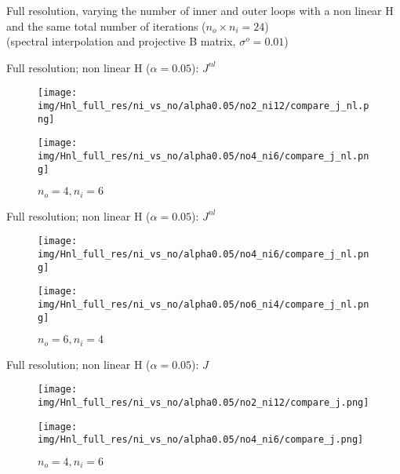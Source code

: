\documentclass[francais]{beamer}
\begin{document}
\begin{frame}
\begin{center}
\large{Full resolution, varying the number of inner and outer loops with a non linear H and the same total number of iterations ($n_o \times n_i =24$)\\
(spectral interpolation and projective B matrix,
$\sigma^o=0.01$)}
\end{center}
\end{frame}


\begin{frame}{Full resolution; non linear H ($\alpha = 0.05$): $J^{nl}$}
\begin{center}
\begin{figure}
  \texttt{[image: img/Hnl\_full\_res/ni\_vs\_no/alpha0.05/no2\_ni12/compare\_j\_nl.png]}
  \caption{$n_o = 2, n_i = 12$}
\endminipage\hfill
{}
  \texttt{[image: img/Hnl\_full\_res/ni\_vs\_no/alpha0.05/no4\_ni6/compare\_j\_nl.png]}
  \caption{$n_o = 4, n_i = 6$}
\endminipage
\end{figure}
\end{center}
\end{frame}

\begin{frame}{Full resolution; non linear H ($\alpha = 0.05$): $J^{nl}$}
\begin{center}
\begin{figure}
  \texttt{[image: img/Hnl\_full\_res/ni\_vs\_no/alpha0.05/no4\_ni6/compare\_j\_nl.png]}
  \caption{$n_o = 4, n_i = 6$}
\endminipage\hfill
{}
  \texttt{[image: img/Hnl\_full\_res/ni\_vs\_no/alpha0.05/no6\_ni4/compare\_j\_nl.png]}
  \caption{$n_o = 6, n_i = 4$}
\endminipage
\end{figure}
\end{center}
\end{frame}

\begin{frame}{Full resolution; non linear H ($\alpha = 0.05$): $J$}
\begin{center}
\begin{figure}
  \texttt{[image: img/Hnl\_full\_res/ni\_vs\_no/alpha0.05/no2\_ni12/compare\_j.png]}
  \caption{$n_o = 2, n_i = 12$}
\endminipage\hfill
{}
  \texttt{[image: img/Hnl\_full\_res/ni\_vs\_no/alpha0.05/no4\_ni6/compare\_j.png]}
  \caption{$n_o = 4, n_i = 6$}
\endminipage
\end{figure}
\end{center}
\end{frame}
\end{document}
